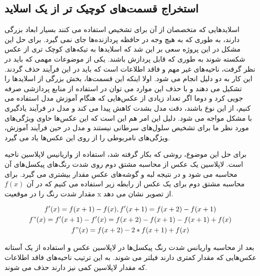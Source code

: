 \subsection{استخراج قسمت‌های کوچیک تر از یک اسلاید}\label{subsec:استخراج-قسمت-های-کوچیک-تر-از-یک-اسلاید}

اسلاید‌هایی که متخصصان از آن برای تشخیص استفاده می کنند بسیار ابعاد بزرگی دارند، به طوری که به هیچ وجه در
حافظه پردازنده‌ها جای نمی گیرد.
برای حل این مشکل در این پروژه سعی بر این شد که اسلاید‌ها به تیکه‌های کوچک تری از عکس شکسته شوند به طوری که قابل پردازش باشند.
یکی از موضوعات مهمی که باید در نظر گرفت، ناحیه‌های غیر مهم و فاقد اطلاعات است که باید در این فرآیند حذف گردند. این کار به دو دلیل انجام می شود.
اولا اینکه این قسمت‌ها، بخش بزرگی از اسلاید‌ها را تشکیل می دهند و با حذف این موارد می توان در استفاده از منابع پردازشی صرفه جویی کرد
و دوما اگر تعداد زیادی از عکس‌هایی که هنگام آموزش مدل استفاده می کنیم، از این نوع باشند، دقت مدل بشدت کاهش پیدا می کند و مدل در فرآیند یادگیری با مشکل مواجه می شود.
دلیل این امر هم این است که این عکس‌ها حاوی ویژگی‌های مورد نظر ما برای تشخیص سلول‌های سرطانی نیستند و مدل در حین فرآیند آموزش، ویژگی‌های نامربوطی را از روی این عکس‌ها یاد می گیرد.

برای حل این موضوع، روشی که بکار گرفته شد، استفاده از واریانیس لاپلاسین ناحیه است.
لاپلاسین یک عکس از محاسبه مشتق دوم روی شدت رنگ‌های پیکسل‌های آن محاسبه می شود
و در نتیجه لبه و گوشه‌های عکس مقدار بیشتری می گیرد.
برای محاسبه مشتق دوم برای یک عکس از رابطه زیر استفاده می کنیم که در آن $f(x)$ مقدار شدت رنگ را در موقعیت x از تصویر نشان می دهد.

\begin{gather*}
    f'(x) = f(x+1) - f(x), f'(x+1) = f(x+2) - f(x+1)\\
    f"(x) = f'(x+1) - f'(x)= f(x+2) - f(x+1) - f(x+1) + f(x)\\
    f"(x) = f(x+2) - 2*f(x+1) + f(x)\\
\end{gather*}

بعد از محاسبه واریانس شدت رنگ پیکسل‌ها در لاپلاسین عکس و استفاده از یک آستانه عکس‌هایی که مقدار کمتری دارند فیلتر می شوند.
به این ترتیب ناحیه‌های فاقد اطلاعات که مقدار لاپلاسین کمی نیز دارند حذف می شوند.

